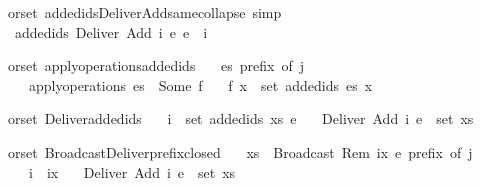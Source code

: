 \begin{isabellebody}
\isamarkupfalse%
\ {\isacharparenleft}\ orset{\isacharparenright}\ added{\isacharunderscore}ids{\isacharunderscore}Deliver{\isacharunderscore}Add{\isacharunderscore}same{\isacharunderscore}collapse\ {\isacharbrackleft}simp{\isacharbrackright}{\isacharcolon}\isanewline
\ \ \ {\isachardoublequoteopen}added{\isacharunderscore}ids\ {\isacharparenleft}{\isacharbrackleft}Deliver\ {\isacharparenleft}Add\ i\ e{\isacharparenright}{\isacharbrackright}{\isacharparenright}\ e\ {\isacharequal}\ {\isacharbrackleft}i{\isacharbrackright}{\isachardoublequoteclose}\isanewline
\end{isabellebody}

\begin{isabellebody}
\isamarkupfalse%
\ {\isacharparenleft}\ orset{\isacharparenright}\ apply{\isacharunderscore}operations{\isacharunderscore}added{\isacharunderscore}ids{\isacharcolon}\isanewline
\ \ \ {\isachardoublequoteopen}es\ prefix\ of\ j{\isachardoublequoteclose}\isanewline
\ \ \ \ \ {\isachardoublequoteopen}apply{\isacharunderscore}operations\ es\ {\isacharequal}\ Some\ f{\isachardoublequoteclose}\isanewline
\ \ \ {\isachardoublequoteopen}f\ x\ {\isasymsubseteq}\ set\ {\isacharparenleft}added{\isacharunderscore}ids\ es\ x{\isacharparenright}{\isachardoublequoteclose}\isanewline
\end{isabellebody}

\begin{isabellebody}
\isamarkupfalse%
\ {\isacharparenleft}\ orset{\isacharparenright}\ Deliver{\isacharunderscore}added{\isacharunderscore}ids{\isacharcolon}\isanewline
\ \ \ {\isachardoublequoteopen}i\ {\isasymin}\ set\ {\isacharparenleft}added{\isacharunderscore}ids\ xs\ e{\isacharparenright}{\isachardoublequoteclose}\isanewline
\ \ \ {\isachardoublequoteopen}Deliver\ {\isacharparenleft}Add\ i\ e{\isacharparenright}\ {\isasymin}\ set\ xs{\isachardoublequoteclose}\isanewline
\end{isabellebody}

\begin{isabellebody}
\isamarkupfalse%
\ {\isacharparenleft}\ orset{\isacharparenright}\ Broadcast{\isacharunderscore}Deliver{\isacharunderscore}prefix{\isacharunderscore}closed{\isacharcolon}\isanewline
\ \ \ {\isachardoublequoteopen}xs\ {\isacharat}\ {\isacharbrackleft}Broadcast\ {\isacharparenleft}Rem\ ix\ e{\isacharparenright}{\isacharbrackright}\ prefix\ of\ j{\isachardoublequoteclose}\isanewline
\ \ \ \ \ {\isachardoublequoteopen}i\ {\isasymin}\ ix{\isachardoublequoteclose}\isanewline
\ \ \ {\isachardoublequoteopen}Deliver\ {\isacharparenleft}Add\ i\ e{\isacharparenright}\ {\isasymin}\ set\ xs{\isachardoublequoteclose}\isanewline
\end{isabellebody}

